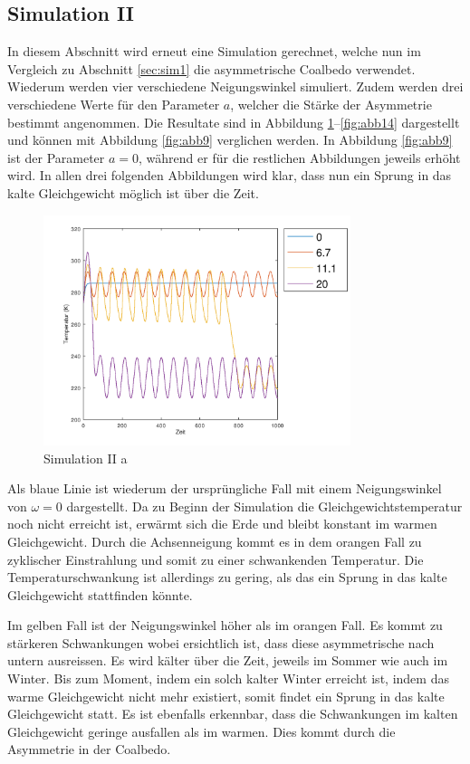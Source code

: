 \begin{refsection}
\subsection{Simulation II} \label{sim2}
In diesem Abschnitt wird erneut eine Simulation gerechnet, welche
nun im Vergleich zu Abschnitt \ref{sec:sim1} die asymmetrische
Coalbedo verwendet. Wiederum werden vier verschiedene Neigungswinkel
simuliert. Zudem werden drei verschiedene Werte für den Parameter
$a$, welcher die Stärke der Asymmetrie bestimmt angenommen. Die
Resultate sind in Abbildung \ref{fig:abb12}--\ref{fig:abb14} dargestellt
und können mit Abbildung \ref{fig:abb9} verglichen werden. In
Abbildung \ref{fig:abb9} ist der Parameter $a=0$, während er für
die restlichen Abbildungen jeweils erhöht wird. In allen drei
folgenden Abbildungen wird klar, dass nun ein Sprung in das kalte
Gleichgewicht möglich ist über die Zeit.
%
\begin{figure}
	\centering
	\includegraphics[width= 0.8\textwidth]{neigung/Zeitachse_1.png}
	\caption[Simulation II a]{Simulation II a}
	\label{fig:abb12}
\end{figure}
%
Als blaue Linie ist wiederum der ursprüngliche Fall mit einem
Neigungswinkel von $\omega=0$ dargestellt. Da zu Beginn der Simulation
die Gleichgewichtstemperatur noch nicht erreicht ist, erwärmt sich
die Erde und bleibt konstant im warmen Gleichgewicht. Durch die
Achsenneigung kommt es in dem orangen Fall zu zyklischer Einstrahlung
und somit zu einer schwankenden Temperatur. Die Temperaturschwankung
ist allerdings zu gering, als das ein Sprung in das kalte Gleichgewicht
stattfinden könnte.

Im gelben Fall ist der Neigungswinkel höher als im orangen Fall.
Es kommt zu stärkeren Schwankungen wobei ersichtlich ist, dass diese
asymmetrische nach untern ausreissen. Es wird kälter über die  Zeit,
jeweils im Sommer wie auch im Winter. Bis zum Moment, indem ein
solch kalter Winter erreicht ist, indem das warme Gleichgewicht
nicht mehr existiert, somit findet ein Sprung in das kalte Gleichgewicht
statt. Es ist ebenfalls erkennbar, dass die Schwankungen im kalten
Gleichgewicht geringe ausfallen als im warmen. Dies kommt durch die
Asymmetrie in der Coalbedo.


\end{refsection}
